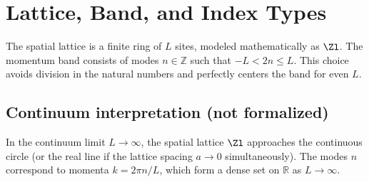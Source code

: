 \chapter{Lattice, Band, and Index Types}
The spatial lattice is a finite ring of $L$ sites, modeled mathematically as $\Zl$. 
The momentum band consists of modes $n \in \mathbb{Z}$ such that $-L < 2n \le L$. 
This choice avoids division in the natural numbers and perfectly centers the band for even $L$.

\section{Continuum interpretation (not formalized)}
In the continuum limit $L \to \infty$, the spatial lattice $\Zl$ approaches the continuous circle (or the real line if the lattice spacing $a \to 0$ simultaneously). 
The modes $n$ correspond to momenta $k = 2\pi n / L$, which form a dense set on $\mathbb{R}$ as $L \to \infty$.
